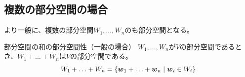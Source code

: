 \documentclass[../../../topic_linear-algebra]{subfiles}
\begin{document}
\subsection{複数の部分空間の場合}

より一般に、複数の部分空間$W_1, \ldots, W_n$のも部分空間となる。

\begin{theorem*}{部分空間の和の部分空間性（一般の場合）}
  $W_1, \ldots, W_n$が$V$の部分空間であるとき、$W_1 + \ldots + W_n$は$V$の部分空間である。
  \begin{equation*}
    W_1 + \ldots + W_n = \{ \vb*{w}_1 + \ldots + \vb*{w}_n \mid \vb*{w}_i \in W_i \}
  \end{equation*}
\end{theorem*}
\end{document}
